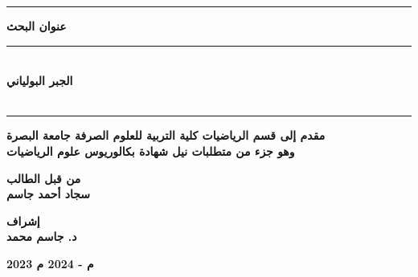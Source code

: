 \begin{Arabic}
\begin{titlepage}
\begin{minipage}{0.2\textwidth}
\end{minipage}

\vspace{1cm}

\begin{center}
\rule{40mm}{0.5mm}
    \huge \textbf{عنوان البحث}
    \rule{40mm}{0.5mm}\\
    \vspace{1cm}
    \Large \textbf{الجبر البولياني}\\
    \vspace{8pt}
    \Large \textbf{}\\
    \vspace{12pt}
    \rule{100mm}{0.5mm}
\end{center}
\vfill
\begin{center}
    \large\textbf{مقدم إلى قسم الرياضيات كلية التربية للعلوم الصرفة جامعة البصرة\\
    \vspace{6pt}
    وهو جزء من متطلبات نيل شهادة بكالوريوس علوم الرياضيات}
\end{center}
\vfill
\begin{center}
    \large\textbf{من قبل الطالب}\\
    \vspace{8pt}
    \large\textbf{سجاد أحمد جاسم}
\end{center}
\vspace{10pt}
\begin{center}
    \large\textbf{إشراف}\\
    \vspace{8pt}
    \large\textbf{د. جاسم محمد}
\end{center}
\vspace{10pt}
\begin{center}
  \large \textbf{2023 م - 2024 م}
\end{center}
\end{titlepage}
\end{Arabic}
